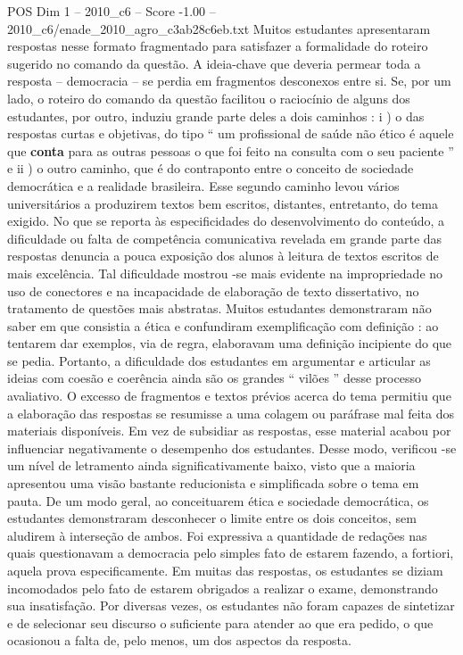 \begin{textsample}{POS Dim 1 – 2010\_c6 – Score -1.00 – 2010\_c6/enade\_2010\_agro\_c3ab28c6eb.txt}
Muitos estudantes apresentaram respostas nesse formato fragmentado para satisfazer a formalidade do roteiro sugerido no comando da questão.
A ideia-chave que deveria permear toda a resposta – democracia – se perdia em fragmentos desconexos entre si.
Se, por um lado, o roteiro do comando da questão facilitou o raciocínio de alguns dos estudantes, por outro, induziu grande parte deles a dois caminhos : i ) o das respostas curtas e objetivas, do tipo “ um profissional de saúde não ético é aquele que \textbf{conta} para as outras pessoas o que foi feito na consulta com o seu paciente ” e ii ) o outro caminho, que é do contraponto entre o conceito de sociedade democrática e a realidade brasileira.
Esse segundo caminho levou vários universitários a produzirem textos bem escritos, distantes, entretanto, do tema exigido.
No que se reporta às especificidades do desenvolvimento do conteúdo, a dificuldade ou falta de competência comunicativa revelada em grande parte das respostas denuncia a pouca exposição dos alunos à leitura de textos escritos de mais excelência.
Tal dificuldade mostrou -se mais evidente na impropriedade no uso de conectores e na incapacidade de elaboração de texto dissertativo, no tratamento de questões mais abstratas.
Muitos estudantes demonstraram não saber em que consistia a ética e confundiram exemplificação com definição : ao tentarem dar exemplos, via de regra, elaboravam uma definição incipiente do que se pedia.
Portanto, a dificuldade dos estudantes em argumentar e articular as ideias com coesão e coerência ainda são os grandes “ vilões ” desse processo avaliativo.
O excesso de fragmentos e textos prévios acerca do tema permitiu que a elaboração das respostas se resumisse a uma colagem ou paráfrase mal feita dos materiais disponíveis.
Em vez de subsidiar as respostas, esse material acabou por influenciar negativamente o desempenho dos estudantes.
Desse modo, verificou -se um nível de letramento ainda significativamente baixo, visto que a maioria apresentou uma visão bastante reducionista e simplificada sobre o tema em pauta.
De um modo geral, ao conceituarem ética e sociedade democrática, os estudantes demonstraram desconhecer o limite entre os dois conceitos, sem aludirem à interseção de ambos.
Foi expressiva a quantidade de redações nas quais questionavam a democracia pelo simples fato de estarem fazendo, a fortiori, aquela prova especificamente.
Em muitas das respostas, os estudantes se diziam incomodados pelo fato de estarem obrigados a realizar o exame, demonstrando sua insatisfação.
Por diversas vezes, os estudantes não foram capazes de sintetizar e de selecionar seu discurso o suficiente para atender ao que era pedido, o que ocasionou a falta de, pelo menos, um dos aspectos da resposta.

\end{textsample}

